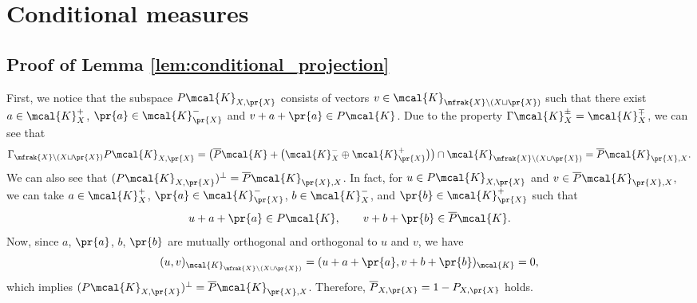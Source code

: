 \section{Conditional measures}\label{sect:conditional_measures}
\subsection{Proof of Lemma \ref{lem:conditional_projection}}
First, we notice that the subspace $P\mcal{K}_{X,\pr{X}}$ consists of vectors $v\in \mcal{K}_{\mfrak{X}\backslash(X\sqcup\pr{X})}$ such that there exist $a\in \mcal{K}_{X}^{+}$, $\pr{a}\in \mcal{K}_{\pr{X}}^{-}$ and $v+a+\pr{a}\in P\mcal{K}$. Due to the property $\Gamma \mcal{K}_{X}^{\pm}=\mcal{K}_{X}^{\mp}$, we can see that
\begin{equation*}
	\Gamma_{\mfrak{X}\backslash(X\sqcup\pr{X})} P\mcal{K}_{X,\pr{X}}=\big(\overline{P}\mcal{K}+\big(\mcal{K}_{X}^{-}\oplus \mcal{K}_{\pr{X}}^{+}\big)\big)\cap \mcal{K}_{\mfrak{X}\backslash (X\cup \pr{X})}=\overline{P}\mcal{K}_{\pr{X},X}.
\end{equation*}
We can also see that $ (P\mcal{K}_{X,\pr{X}})^{\perp}=\overline{P}\mcal{K}_{\pr{X},X}$. In fact, for $u\in P\mcal{K}_{X,\pr{X}}$ and $v\in \overline{P}\mcal{K}_{\pr{X},X}$, we can take $a\in \mcal{K}_{X}^{+}$, $\pr{a}\in \mcal{K}_{\pr{X}}^{-}$, $b\in \mcal{K}_{X}^{-}$, and $\pr{b}\in \mcal{K}_{\pr{X}}^{+}$ such that
\begin{gather*}
	u+a+\pr{a} \in P\mcal{K}, \qquad v+b+\pr{b}\in \overline{P}\mcal{K}.
\end{gather*}
Now, since $a$, $\pr{a}$, $b$, $\pr{b}$ are mutually orthogonal and orthogonal to $u$ and $v$, we have
\begin{equation*}
	(u,v)_{\mcal{K}_{\mfrak{X}\backslash (X\cup\pr{X})}}=(u+a+\pr{a},v+b+\pr{b})_{\mcal{K}}=0,
\end{equation*}
which implies $(P\mcal{K}_{X,\pr{X}})^{\perp}=\overline{P}\mcal{K}_{\pr{X},X}$.
Therefore, $\overline{P}_{X,\pr{X}}=1-P_{X,\pr{X}}$ holds.

